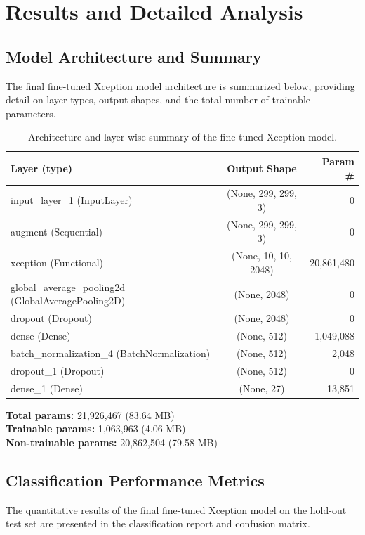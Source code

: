 \documentclass[12pt, a4paper]{report}
\begin{document}
\section{Results and Detailed Analysis}
\label{sec:results_analysis}

\subsection*{Model Architecture and Summary} %
\noindent
The final fine-tuned Xception model architecture is summarized below, providing detail on layer types, output shapes, and the total number of trainable parameters.

\begin{table}[H]
    \centering
    \renewcommand{\arraystretch}{1.15}
    \begin{tabular}{|l|c|r|}
        \hline
        \textbf{Layer (type)} & \textbf{Output Shape} & \textbf{Param \#} \\
        \hline
        input\_layer\_1 (InputLayer) & (None, 299, 299, 3) & 0 \\
        augment (Sequential) & (None, 299, 299, 3) & 0 \\
        xception (Functional) & (None, 10, 10, 2048) & 20,861,480 \\
        global\_average\_pooling2d (GlobalAveragePooling2D) & (None, 2048) & 0 \\
        dropout (Dropout) & (None, 2048) & 0 \\
        dense (Dense) & (None, 512) & 1,049,088 \\
        batch\_normalization\_4 (BatchNormalization) & (None, 512) & 2,048 \\
        dropout\_1 (Dropout) & (None, 512) & 0 \\
        dense\_1 (Dense) & (None, 27) & 13,851 \\
        \hline
    \end{tabular}
    \caption{Architecture and layer-wise summary of the fine-tuned Xception model.}
\end{table}

\noindent \textbf{Total params:} 21,926,467 (83.64 MB)\\
\textbf{Trainable params:} 1,063,963 (4.06 MB)\\
\textbf{Non-trainable params:} 20,862,504 (79.58 MB)

\subsection*{Classification Performance Metrics} %
\noindent
The quantitative results of the final fine-tuned Xception model on the hold-out test set are presented in the classification report and confusion matrix.
\end{document}
